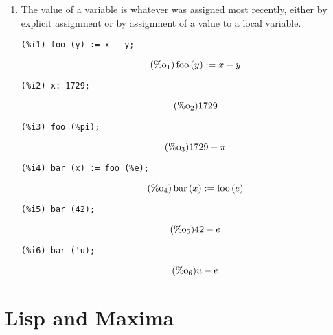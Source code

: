 \documentclass[12pt,leqno]{article}
\begin{document}
\begin{enumerate}
\item The value of a variable is whatever was assigned most recently,
either by explicit assignment or by assignment of a value to a local variable.

\begin{verbatim}
(%i1) foo (y) := x - y;
\end{verbatim}
\begin{equation}
\tag{$\mathop{\mathrm{\%o}_{1}}$}\mathop{\mathrm{foo}}\left(y\right) := x-y
\label{eq:doc-group1-code35-1-1}
\end{equation}
\begin{verbatim}
(%i2) x: 1729;
\end{verbatim}
\begin{equation}
\tag{$\mathop{\mathrm{\%o}_{2}}$}1729
\label{eq:doc-group1-code35-2-1}
\end{equation}
\begin{verbatim}
(%i3) foo (%pi);
\end{verbatim}
\begin{equation}
\tag{$\mathop{\mathrm{\%o}_{3}}$}1729-\pi
\label{eq:doc-group1-code35-3-1}
\end{equation}
\begin{verbatim}
(%i4) bar (x) := foo (%e);
\end{verbatim}
\begin{equation}
\tag{$\mathop{\mathrm{\%o}_{4}}$}\mathop{\mathrm{bar}}\left(x\right) := \mathop{\mathrm{foo}}\left(e\right)
\label{eq:doc-group1-code35-4-1}
\end{equation}
\begin{verbatim}
(%i5) bar (42);
\end{verbatim}
\begin{equation}
\tag{$\mathop{\mathrm{\%o}_{5}}$}42-e
\label{eq:doc-group1-code35-5-1}
\end{equation}
\begin{verbatim}
(%i6) bar ('u);
\end{verbatim}
\begin{equation}
\tag{$\mathop{\mathrm{\%o}_{6}}$}u-e
\label{eq:doc-group1-code35-6-1}
\end{equation}


\end{enumerate}

\section{Lisp and Maxima}
\end{document}
